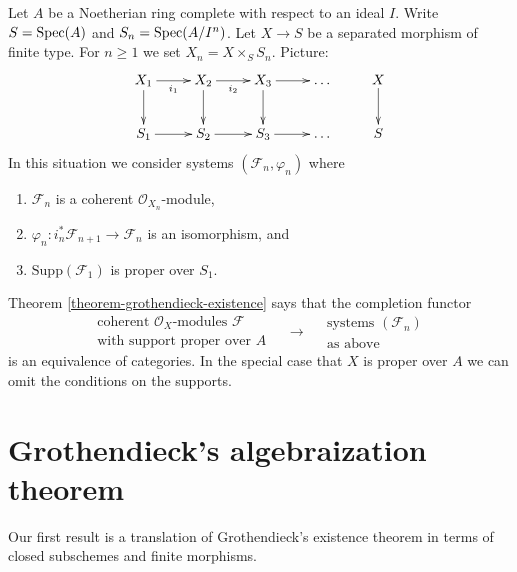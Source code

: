 \begin{remark}
\label{remark-reformulate-existence-theorem}
Let $A$ be a Noetherian ring complete with respect to an ideal $I$.
Write $S = \mathop{\mathrm{Spec}}(A)$ and $S_n = \mathop{\mathrm{Spec}}(A/I^n)$.
Let $X \to S$ be a separated morphism of finite type.
For $n \geq 1$ we set $X_n = X \times_S S_n$.
Picture:
$$
\xymatrix{
X_1 \ar[r]_{i_1} \ar[d] & X_2 \ar[r]_{i_2} \ar[d] & X_3 \ar[r] \ar[d] &
\ldots & X \ar[d] \\
S_1 \ar[r] & S_2 \ar[r] & S_3 \ar[r] & \ldots & S
}
$$
In this situation we consider systems $(\mathcal{F}_n, \varphi_n)$
where
\begin{enumerate}
\item $\mathcal{F}_n$ is a coherent $\mathcal{O}_{X_n}$-module,
\item $\varphi_n : i_n^*\mathcal{F}_{n + 1} \to \mathcal{F}_n$
is an isomorphism, and
\item $\text{Supp}(\mathcal{F}_1)$ is proper over $S_1$.
\end{enumerate}
Theorem \ref{theorem-grothendieck-existence} says that the
completion functor
$$
\begin{matrix}
\text{coherent }\mathcal{O}_X\text{-modules }\mathcal{F} \\
\text{with support proper over }A
\end{matrix}
\quad
\longrightarrow
\quad
\begin{matrix}
\text{systems }(\mathcal{F}_n) \\
\text{as above}
\end{matrix}
$$
is an equivalence of categories. In the special case that $X$ is
proper over $A$ we can omit the conditions on the supports.
\end{remark}



\section{Grothendieck's algebraization theorem}
\label{section-algebraization}

\noindent
Our first result is a translation of Grothendieck's existence
theorem in terms of closed subschemes and finite morphisms.

